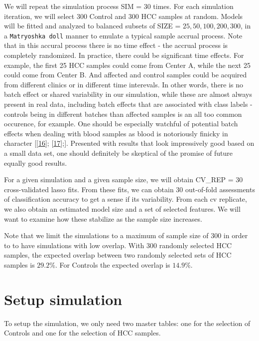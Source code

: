 \documentclass[
]{book}
\begin{document}
We will repeat the simulation process SIM = \(30\) times.
For each simulation iteration, we will select \(300\) Control and
\(300\) HCC samples at random. Models will be fitted and analyzed
to balanced subsets of SIZE = \(25, 50, 100, 200, 300\), in a \texttt{Matryoshka\ doll} manner to
emulate a typical sample accrual process. Note that in this accural process
there is no time effect - the accrual process is completely randomized. In practice,
there could be significant time effects. For example, the first 25 HCC samples could come
from Center A, while the next 25 could come from Center B. And
affected and control samples could be acquired from different clinics
or in different time interevals. In other words,
there is no batch effect or shared variability in our simulation,
while these are almost always present in real data, including
batch effects that are associated with class labels - controls being in
different batches than affected samples is an all too common occurence,
for example. One should be especially watchful of potential batch effects
when dealing with blood samples as blood is notoriously finicky in
character {[}{[}\protect\hyperlink{ref-Huang:2017aa}{16}{]}; {[}\protect\hyperlink{ref-Permenter:2015aa}{17}{]};{]}.
Presented with results that look impressively good based on a small data set,
one should definitely be skeptical of the promise of future equally good results.

For a given simulation and a given sample size, we will obtain
CV\_REP = \(30\) cross-validated lasso fits. From these fits,
we can obtain \(30\) out-of-fold assessments of classification accuracy
to get a sense if its variability. From each cv replicate, we also obtain
an estimated model size and a set of selected features. We will want
to examine how these stabilize as the sample size increases.

Note that we limit the simulations to a maximum of sample size of 300 in
order to to have simulations with low overlap. With 300
randomly selected HCC samples, the expected overlap between two randomly
selected sets of HCC samples is \(29.2\)\%.
For Controls the expected overlap is \(14.9\)\%.

\hypertarget{setup-simulation}{%
\section{Setup simulation}\label{setup-simulation}}

To setup the simulation, we only need two master tables: one for the selection of Controls
and one for the selection of HCC samples.
\end{document}
